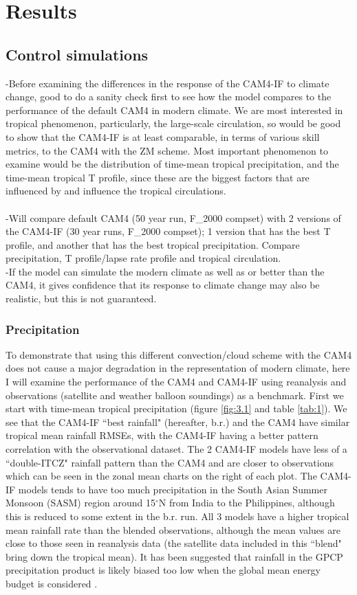 \documentclass[letterpaper,12pt,titlepage,oneside,final]{book}
\begin{document}
\chapter{Results}
\section{Control simulations}
-Before examining the differences in the response of the CAM4-IF to climate change, good to do a sanity check first to see how the model compares to the performance of the default CAM4 in modern climate. We are most interested in tropical phenomenon, particularly, the large-scale circulation, so would be good to show that the CAM4-IF is at least comparable, in terms of various skill metrics, to the CAM4 with the ZM scheme. Most important phenomenon to examine would be the distribution of time-mean tropical precipitation, and the time-mean tropical T profile, since these are the biggest factors that are influenced by and influence the tropical circulations.
\\
\\
-Will compare default CAM4 (50 year run, F\_2000 compset) with 2 versions of the CAM4-IF (30 year runs, F\_2000 compset); 1 version that has the best T profile, and another that has the best tropical precipitation. Compare precipitation, T profile/lapse rate profile and tropical circulation.
\\
-If the model can simulate the modern climate as well as or better than the CAM4, it gives confidence that its response to climate change may also be realistic, but this is not guaranteed.

\subsection{Precipitation}
To demonstrate that using this different convection/cloud scheme with the CAM4 does not cause a major degradation in the representation of modern climate, here I will examine the performance of the CAM4 and CAM4-IF using reanalysis and observations (satellite and weather balloon soundings) as a benchmark. First we start with time-mean tropical precipitation (figure \ref{fig:3.1} and table \ref{tab:1}). We see that the CAM4-IF ``best rainfall" (hereafter, b.r.) and the CAM4 have similar tropical mean rainfall RMSEs, with the CAM4-IF having a better pattern correlation with the observational dataset. The 2 CAM4-IF models  have less of a ``double-ITCZ" rainfall pattern than the CAM4 and are closer to observations which can be seen in the zonal mean charts on the right of each plot. The CAM4-IF models tends to have too much precipitation in the South Asian Summer Monsoon (SASM) region around 15$^\circ$N from India to the Philippines, although this is reduced to some extent in the b.r. run. All 3 models have a higher tropical mean rainfall rate than the blended observations, although the mean values are close to those seen in reanalysis data (the satellite data included in this ``blend" bring down the tropical mean). It has been suggested that rainfall in the GPCP precipitation product is likely biased too low when the global mean energy budget is considered \citep{trenberth_earths_2009,trenberth_regional_2013}.
\end{document}
